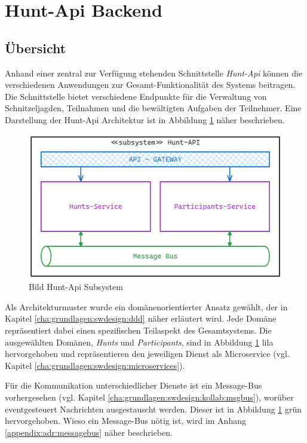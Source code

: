 \section{Hunt-Api Backend} \label{cha:swentwurf:backend}

\subsection{Übersicht}

Anhand einer zentral zur Verfügung stehenden Schnittstelle \textit{Hunt-Api} können die verschiedenen Anwendungen zur Gesamt-Funktionalität des Systems beitragen. Die Schnittstelle bietet verschiedene Endpunkte für die Verwaltung von Schnitzeljagden, Teilnahmen und die bewältigten Aufgaben der Teilnehmer. Eine Darstellung der Hunt-Api Architektur ist in Abbildung \ref{fig:swentwurf:huntapi:subsystem} näher beschrieben.

\begin{figure}[H]
    \centering
    \includegraphics[width=\textwidth]{images/PrAr-Software-Entwurf-Hunt-Api-Subsystem.png}
    \caption{Bild Hunt-Api Subsystem}
    \label{fig:swentwurf:huntapi:subsystem}
\end{figure}

Als Architekturmuster wurde ein domänenorientierter Ansatz gewählt, der in Kapitel \ref{cha:grundlagen:swdesign:ddd} näher erläutert wird. Jede Domäne repräsentiert dabei einen spezifischen Teilaspekt des Gesamtsystems. Die ausgewählten Domänen, \textit{Hunts} und \textit{Participants}, sind in Abbildung \ref{fig:swentwurf:huntapi:subsystem} lila hervorgehoben und repräsentieren den jeweiligen Dienst als Microservice (vgl. Kapitel \ref{cha:grundlagen:swdesign:microservices}).

Für die Kommunikation unterschiedlicher Dienste ist ein Message-Bus vorhergesehen (vgl. Kapitel \ref{cha:grundlagen:swdesign:kollab:msgbus}), worüber eventgesteuert Nachrichten ausgestauscht werden. Dieser ist in Abbildung \ref{fig:swentwurf:huntapi:subsystem} grün hervorgehoben. Wieso ein Message-Bus nötig ist, wird im Anhang \ref{appendix:adr:messagebus} näher beschrieben.

